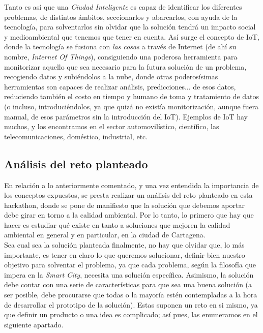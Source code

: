 \documentclass[12pt]{article}
\begin{document}
	Tanto es así que una \textit{Ciudad Inteligente} es capaz de identificar los diferentes problemas, de distintos ámbitos, seccionarlos y abarcarlos, con ayuda de la tecnología, para solventarlos sin olvidar que la solución tendrá un impacto social y medioambiental que tenemos que tener en cuenta. Así surge el concepto de IoT, donde la tecnología se fusiona con \textit{las cosas} a través de Internet (de ahí su nombre, \textit{Internet Of Things}), consiguiendo una poderosa herramienta para monitorizar aquello que sea necesario para la futura solución de un problema, recogiendo datos y subiéndolos a la nube, donde otras poderosísimas herramientas son capaces de realizar análisis, predicciones... de esos datos, reduciendo también el costo en tiempo y humano de toma y tratamiento de datos (o incluso, introduciéndolos, ya que quizá no existía monitorización, aunque fuera manual, de esos parámetros sin la introducción del IoT). Ejemplos de IoT hay muchos, y los encontramos en el sector automovilístico, científico, las telecomunicaciones, doméstico, industrial, etc. 
	
	\subsection{Análisis del reto planteado}
	
	En relación a lo anteriormente comentado, y una vez entendida la importancia de los conceptos expuestos, se presta realizar un análisis del reto planteado en esta hackathon, donde se pone de manifiesto que la solución que debemos aportar debe girar en torno a la calidad ambiental. Por lo tanto, lo primero que hay que hacer es estudiar qué existe en tanto a soluciones que mejoren la calidad ambiental en general y en particular, en la ciudad de Cartagena. \\
	
	Sea cual sea la solución planteada finalmente, no hay que olvidar que, lo más importante, es tener en claro lo que queremos solucionar, definir bien nuestro objetivo para solventar el problema, ya que cada problema, según la filosofía que impera en la \textit{Smart City}, necesita una solución específica. Asimismo, la solución debe contar con una serie de características para que sea una buena solución (a ser posible, debe procurarse que todas o la mayoría estén contempladas a la hora de desarrollar el prototipo de la solución). Estas suponen un reto en si mismo, ya que definir un producto o una idea es complicado; así pues, las enumeramos en el siguiente apartado.
	
\end{document}
